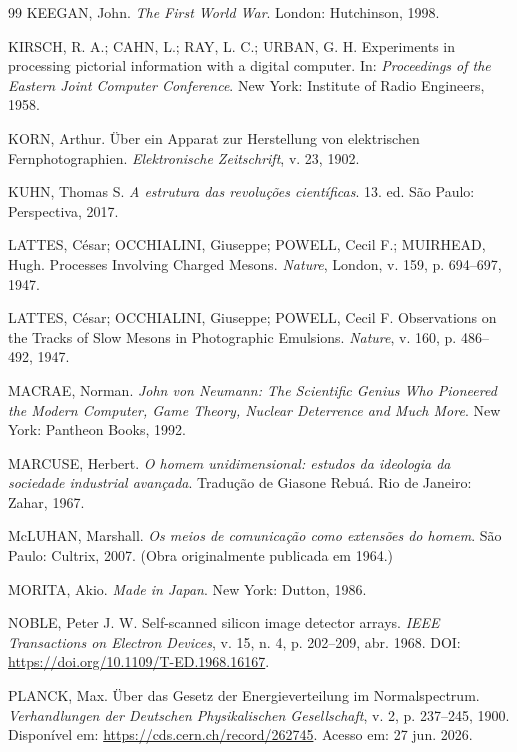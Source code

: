 \documentclass{hipatia}
\begin{document}
{\begin{thebibliography}{99}
KEEGAN, John.
\textit{The First World War}.
London: Hutchinson, 1998.

KIRSCH, R. A.; CAHN, L.; RAY, L. C.; URBAN, G. H.
Experiments in processing pictorial information with a digital computer.
In: \textit{Proceedings of the Eastern Joint Computer Conference}.
New York: Institute of Radio Engineers, 1958.

KORN, Arthur.
Über ein Apparat zur Herstellung von elektrischen Fernphotographien.
\textit{Elektronische Zeitschrift},
v. 23,
1902.

KUHN, Thomas S.
\textit{A estrutura das revoluções científicas}.
13. ed.
São Paulo: Perspectiva, 2017.

LATTES, César; OCCHIALINI, Giuseppe; POWELL, Cecil F.; MUIRHEAD, Hugh.
Processes Involving Charged Mesons.
\textit{Nature},
London,
v. 159,
p. 694--697,
1947.

LATTES, César; OCCHIALINI, Giuseppe; POWELL, Cecil F.
Observations on the Tracks of Slow Mesons in Photographic Emulsions.
\textit{Nature},
v. 160,
p. 486--492,
1947.

MACRAE, Norman.
\textit{John von Neumann: The Scientific Genius Who Pioneered the Modern Computer, Game Theory, Nuclear Deterrence and Much More}.
New York: Pantheon Books, 1992.

MARCUSE, Herbert.
\textit{O homem unidimensional: estudos da ideologia da sociedade industrial avançada}.
Tradução de Giasone Rebuá.
Rio de Janeiro: Zahar, 1967.

McLUHAN, Marshall.
\textit{Os meios de comunicação como extensões do homem}.
São Paulo: Cultrix, 2007.
(Obra originalmente publicada em 1964.)

MORITA, Akio.
\textit{Made in Japan}.
New York: Dutton, 1986.

NOBLE, Peter J. W.
Self-scanned silicon image detector arrays.
\textit{IEEE Transactions on Electron Devices},
v. 15,
n. 4,
p. 202--209,
abr. 1968.
DOI:
\url{https://doi.org/10.1109/T-ED.1968.16167}.

PLANCK, Max.
Über das Gesetz der Energieverteilung im Normalspectrum.
\textit{Verhandlungen der Deutschen Physikalischen Gesellschaft},
v. 2,
p. 237--245,
1900.
Disponível em:
\url{https://cds.cern.ch/record/262745}.
Acesso em: 27 jun. 2026.


\end{thebibliography}}
\end{document}
